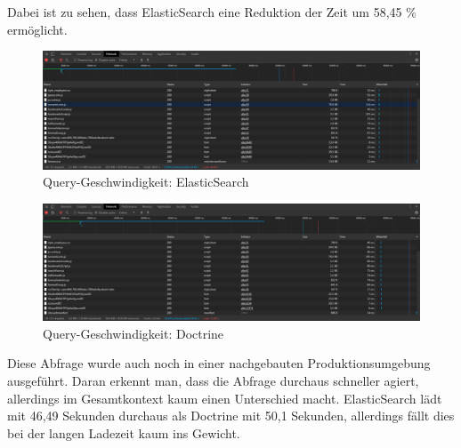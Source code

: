 Dabei ist zu sehen, dass ElasticSearch eine Reduktion der Zeit um 58,45 \% ermöglicht.


\begin{figure}
	\centering
	\includegraphics[width=1\linewidth]{images/setup/query/time_prod_ela.png}
	\caption{Query-Geschwindigkeit: ElasticSearch}
	\label{img:timeProdEla}
\end{figure}

\begin{figure}
	\centering
	\includegraphics[width=1\linewidth]{images/setup/query/time_prod_db.png}
	\caption{Query-Geschwindigkeit: Doctrine}
	\label{img:timeProdDb}
\end{figure}

Diese Abfrage wurde auch noch in einer nachgebauten Produktionsumgebung ausgeführt. Daran erkennt man, dass die Abfrage durchaus schneller agiert, allerdings im Gesamtkontext kaum einen Unterschied macht. ElasticSearch lädt mit 46,49 Sekunden durchaus als Doctrine mit 50,1 Sekunden, allerdings fällt dies bei der langen Ladezeit kaum ins Gewicht.
